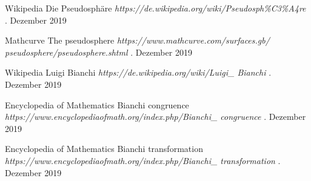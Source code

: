 \documentclass[12pt]{beamer}
\begin{document}
\begin{frame}

\footnotesize{
\begin{thebibliography}{99}

 Wikipedia
\newblock Die Pseudosphäre
\newblock \emph{https://de.wikipedia.org/wiki/Pseudosph\%C3\%A4re}
. Dezember 2019

 Mathcurve
\newblock The pseudosphere
\newblock \emph{https://www.mathcurve.com/surfaces.gb/\\pseudosphere/pseudosphere.shtml}
. Dezember 2019

 Wikipedia
\newblock Luigi Bianchi
\newblock \emph{https://de.wikipedia.org/wiki/Luigi\_ Bianchi}
. Dezember 2019

\end{thebibliography}
}

\end{frame}

\begin{frame}

\footnotesize{
\begin{thebibliography}{99}

 Encyclopedia of Mathematics
\newblock Bianchi congruence
\newblock \emph{https://www.encyclopediaofmath.org/index.php/Bianchi\_ congruence}
. Dezember 2019

 Encyclopedia of Mathematics
\newblock Bianchi transformation
\newblock \emph{https://www.encyclopediaofmath.org/index.php/Bianchi\_ transformation}
. Dezember 2019

\end{thebibliography}
}

\end{frame}
\end{document}
